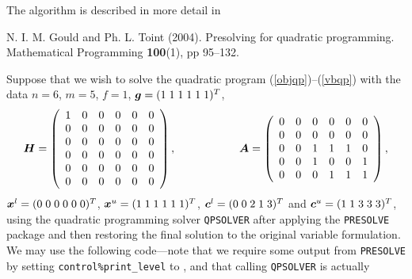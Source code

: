 \documentclass{galahad}
\newcommand{\packagename}{PRESOLVE}
\newcommand{\sym}{\tt\small}
\begin{document}
\vspace*{1mm}

\galreferences
\vspace*{1mm}

\noindent
The algorithm is described in more detail in
\vspace*{1mm}

\noindent
N. I. M. Gould and Ph. L. Toint (2004).
Presolving for quadratic programming.
Mathematical Programming {\bf 100}(1), pp 95--132.
\vspace*{1mm}



\galexample
Suppose that we wish to solve the quadratic program
(\ref{objqp})--(\ref{vbqp}) with the data $n = 6$, $m = 5$, $f = 1$,
${\bm{g}} = ( 1 \; 1 \; 1 \; 1 \; 1 \; 1)^T$,
\[
{\bm{H}} =\left(\begin{array}{cccccc}
        1 & 0 & 0 & 0 & 0 & 0 \\
        0 & 0 & 0 & 0 & 0 & 0 \\
        0 & 0 & 0 & 0 & 0 & 0 \\
        0 & 0 & 0 & 0 & 0 & 0 \\
        0 & 0 & 0 & 0 & 0 & 0 \\
        0 & 0 & 0 & 0 & 0 & 0 \\
        \end{array}\right),
\hspace*{2cm}
{\bm{A}} = \left(\begin{array}{cccccc}
        0 & 0 & 0 & 0 & 0 & 0 \\
        0 & 0 & 0 & 0 & 0 & 0 \\
        0 & 0 & 1 & 1 & 1 & 0 \\
        0 & 0 & 1 & 0 & 0 & 1 \\
        0 & 0 & 0 & 1 & 1 & 1 \\
        \end{array}\right),
\]
${\bm{x}}^l = ( 0\; 0\; 0\; 0\; 0\; 0 )^T$,
${\bm{x}}^u = ( 1 \; 1 \; 1 \; 1 \; 1 \; 1 )^T$,
${\bm{c}}^l = ( 0 \; 0 \; 2 \; 1 \; 3 )^T$ and
${\bm{c}}^u = ( 1 \; 1 \; 3 \; 3 \; 3 )^T$,
using the quadratic programming solver {\tt QPSOLVER} after applying
the {\tt \packagename} package and then restoring the final solution to the
original
variable formulation. We may use the following code---note that we require
some output from {\tt \packagename} by setting {\tt control\%print\_level} to
{\sym \galsymtrace}, and that calling {\tt QPSOLVER} is actually
\end{document}
